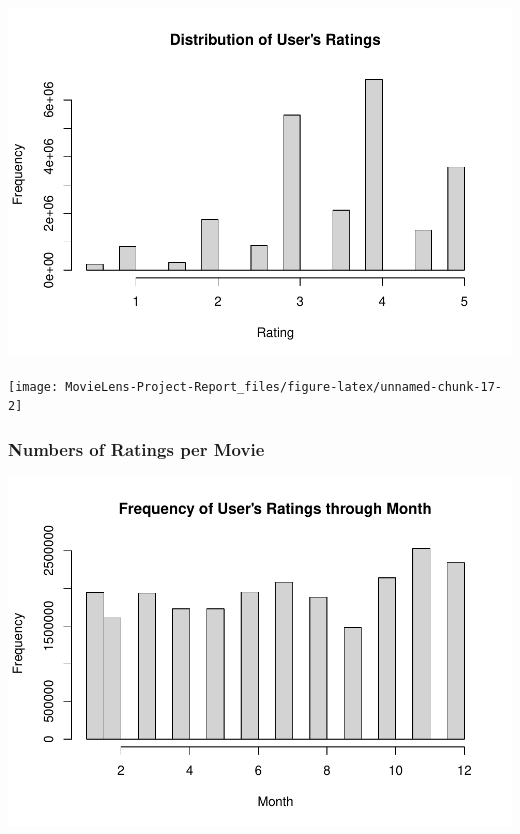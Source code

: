 \documentclass[
]{article}
\begin{document}
\begin{center}\includegraphics{MovieLens-Project-Report_files/figure-latex/unnamed-chunk-17-1} \end{center}

\begin{center}\texttt{[image: MovieLens-Project-Report\_files/figure-latex/unnamed-chunk-17-2]} \end{center}

\hypertarget{numbers-of-ratings-per-movie}{%
\subsubsection{Numbers of Ratings per
Movie}\label{numbers-of-ratings-per-movie}}

\begin{center}\includegraphics{MovieLens-Project-Report_files/figure-latex/unnamed-chunk-18-1} \end{center}
\end{document}
